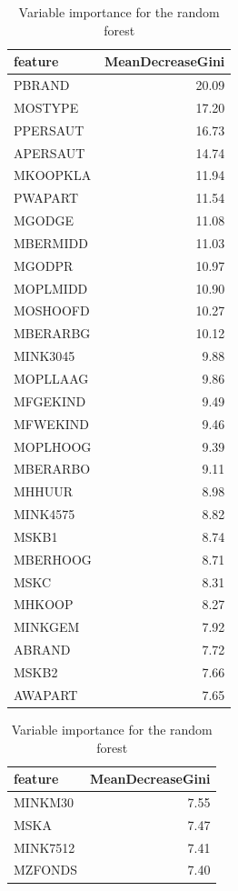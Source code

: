 \documentclass[
  12pt,
  oneside]{report}
\begin{document}
\begin{table}[H]
\caption{\label{tab:unnamed-chunk-22}Variable importance for the random forest}

\centering
\fontsize{9}{11}\selectfont
\begin{tabular}[t]{l|r}
\hline
feature & MeanDecreaseGini\\
\hline
PBRAND & 20.09\\
\hline
MOSTYPE & 17.20\\
\hline
PPERSAUT & 16.73\\
\hline
APERSAUT & 14.74\\
\hline
MKOOPKLA & 11.94\\
\hline
PWAPART & 11.54\\
\hline
MGODGE & 11.08\\
\hline
MBERMIDD & 11.03\\
\hline
MGODPR & 10.97\\
\hline
MOPLMIDD & 10.90\\
\hline
MOSHOOFD & 10.27\\
\hline
MBERARBG & 10.12\\
\hline
MINK3045 & 9.88\\
\hline
MOPLLAAG & 9.86\\
\hline
MFGEKIND & 9.49\\
\hline
MFWEKIND & 9.46\\
\hline
MOPLHOOG & 9.39\\
\hline
MBERARBO & 9.11\\
\hline
MHHUUR & 8.98\\
\hline
MINK4575 & 8.82\\
\hline
MSKB1 & 8.74\\
\hline
MBERHOOG & 8.71\\
\hline
MSKC & 8.31\\
\hline
MHKOOP & 8.27\\
\hline
MINKGEM & 7.92\\
\hline
ABRAND & 7.72\\
\hline
MSKB2 & 7.66\\
\hline
AWAPART & 7.65\\
\hline
\end{tabular}
\centering
\begin{tabular}[t]{l|r}
\hline
feature & MeanDecreaseGini\\
\hline
MINKM30 & 7.55\\
\hline
MSKA & 7.47\\
\hline
MINK7512 & 7.41\\
\hline
MZFONDS & 7.40\\

\end{tabular}
\end{table}
\end{document}
